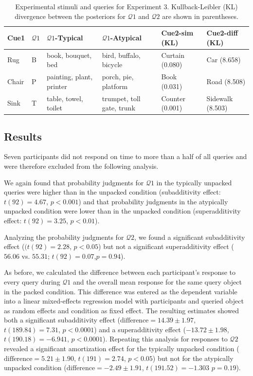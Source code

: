 \begin{table}

\caption{Experimental stimuli and queries for Experiment 3. Kullback-Leibler (KL) divergence between the posteriors for $\mathcal{Q}1$ and $\mathcal{Q}2$ are shown in parentheses.}
\label{tab:scenarios3}
\centering
\begin{tabular}{p{} p{} >{\raggedright}p{} >{\raggedright}p{} p{} p{}}
  \toprule
\bf{Cue1} & \bf{$\mathcal{Q}1$} & \bf{$\mathcal{Q}1$-Typical} & \bf{$\mathcal{Q}1$-Atypical}& \bf{Cue2-sim (KL)} & \bf{Cue2-diff (KL)}\tabularnewline
\midrule

Rug & B & book, bouquet, bed & bird, buffalo, bicycle & Curtain (0.080)& Car (8.658)\tabularnewline

Chair & P & painting, plant, printer & porch, pie, platform & Book (0.031) & Road (8.508)\tabularnewline

Sink & T & table, towel, toilet & trumpet, toll gate, trunk & Counter (0.001)& Sidewalk (8.503)\tabularnewline
\bottomrule
\end{tabular}
\end{table}

\subsection{Results}

Seven participants did not respond on time to more than a half of all queries and were therefore excluded from the following analysis.

We again found that probability judgments for $\mathcal{Q}1$ in the typically unpacked queries were higher than in the unpacked condition (subadditivity effect: $t(92)=4.67$, $p<0.001$) and that probability judgments in the atypically unpacked condition were lower than in the unpacked condition (superadditivity effect: $t(92)=3.25$, $p<0.01$).

Analyzing the probability judgments for $\mathcal{Q}2$, we found a significant subadditivity effect ($(t(92)=2.28$, $p<0.05$) but not a significant superadditivity effect ($56.06$ vs. $55.31$; $t(92)=0.07$,$p=0.94$).

As before, we calculated the difference between each participant's response to every query during $\mathcal{Q}1$ and the overall mean response for the same query object in the packed condition. This difference was entered as the dependent variable into a linear mixed-effects regression model with participants and queried object as random effects and condition as fixed effect. The resulting estimates showed both a significant subadditivity effect ($\text{difference}=14.39\pm1.97$, $t(189.84)=7.31$, $p<0.0001$) and a superadditivity effect ($-13.72\pm1.98$, $t(190.18)=-6.941$, $p<0.0001$). Repeating this analysis for responses to $\mathcal{Q}2$ revealed a significant amortization effect for the typically unpacked condition ($\text{difference}=5.21\pm1.90$, $t(191)=2.74$, $p<0.05$) but not for the atypically unpacked condition ($\text{difference}=-2.49\pm1.91$, $t(191.52)=-1.303$ $p=0.19$). 

